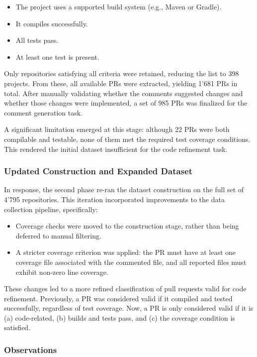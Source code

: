 \begin{itemize}
	\item The project uses a supported build system (e.g., Maven or Gradle).
	\item It compiles successfully.
	\item All tests pass.
	\item At least one test is present.
\end{itemize}

Only repositories satisfying all criteria were retained, reducing the list to 398 projects. From
these, all available PRs were extracted, yielding 1'681 PRs in total. After manually validating
whether the comments suggested changes and whether those changes were implemented, a set of 985 PRs
was finalized for the comment generation task.

A significant limitation emerged at this stage: although 22 PRs were both compilable and testable,
none of them met the required test coverage conditions. This rendered the initial dataset
insufficient for the code refinement task.

\subsubsection{Updated Construction and Expanded Dataset}

In response, the second phase re-ran the dataset construction on the full set of 4'795 repositories.
This iteration incorporated improvements to the data collection pipeline, specifically:

\begin{itemize}
	\item Coverage checks were moved to the construction stage, rather than being deferred to manual
	      filtering.
	\item A stricter coverage criterion was applied: the PR must have at least one coverage file
	      associated with the commented file, and all reported files must exhibit non-zero line
	      coverage.
\end{itemize}

These changes led to a more refined classification of pull requests valid for code refinement.
Previously, a PR was considered valid if it compiled and tested successfully, regardless of test
coverage. Now, a PR is only considered valid if it is (a) code-related, (b) builds and tests pass,
and (c) the coverage condition is satisfied.

\subsubsection{Observations}

